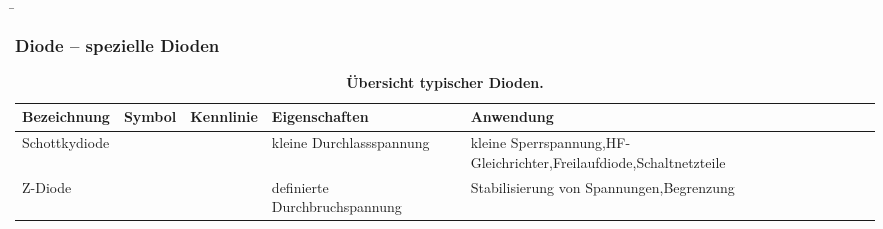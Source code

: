 \begin{frame}
    \b{
        \frametitle{Diode -- spezielle Dioden}
        \begin{table}[H]
            \centering 
            \begin{tabular}{ |p{2.1cm}|p{1.4cm}|p{3.2cm}|p{2.8cm}|p{3cm}| }
                \hline
                \textbf{Bezeichnung} & \textbf{Symbol} & \textbf{Kennlinie} & \textbf{Eigenschaften} & \textbf{Anwendung} \\
                \hline
                Schottky\-diode
                &
                \begin{minipage}[t][2.6cm][c]{1.4cm}
                    \centering 
                \end{minipage}
                & 
                \begin{minipage}[t][2.6cm][c]{3.3cm}
                    \centering 
                \end{minipage}
                & 
                 kleine Durchlassspannung &
                 kleine Sperrspannung,\newline HF-Gleichrichter,\newline Freilaufdiode,\newline Schaltnetzteile\\
                \hline
                Z-Diode
                &
                \begin{minipage}[t][2.6cm][c]{1.4cm}
                    \centering 
                \end{minipage}
                & 
                \begin{minipage}[t][2.6cm][c]{3.3cm}
                    \centering 
                \end{minipage}
                & 
                definierte Durchbruchspannung &
                Stabilisierung von Spannungen,\newline Begrenzung\\
                \hline
            \end{tabular}
            \caption{\textbf{Übersicht typischer Dioden.}}
        \end{table}
    }

\end{frame}

